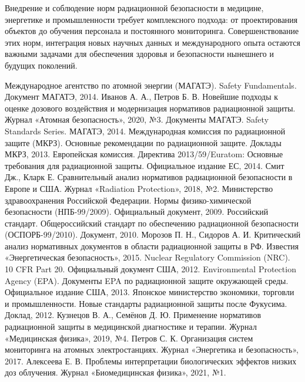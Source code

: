 \documentclass[a4paper, 14pt]{extarticle}
\begin{document}
Внедрение и соблюдение норм радиационной безопасности в медицине, энергетике и промышленности требует комплексного подхода: от проектирования объектов до обучения персонала и постоянного мониторинга. Совершенствование этих норм, интеграция новых научных данных и международного опыта остаются важными задачами для обеспечения здоровья и безопасности нынешнего и будущих поколений.


\newpage
\begin{thebibliography}{99}
     Международное агентство по атомной энергии (МАГАТЭ). Safety Fundamentals. Документ МАГАТЭ, 2014.
     Иванов А. А., Петров Б. В. Новейшие подходы к оценке дозового воздействия и модернизация нормативов радиационной защиты. Журнал «Атомная безопасность», 2020, №3.
     Документы МАГАТЭ. Safety Standards Series. МАГАТЭ, 2014.
     Международная комиссия по радиационной защите (МКРЗ). Основные рекомендации по радиационной защите. Доклады МКРЗ, 2013.
     Европейская комиссия. Директива 2013/59/Euratom: Основные требования для радиационной защиты. Официальное издание ЕС, 2014.
     Смит Дж., Кларк Е. Сравнительный анализ нормативов радиационной безопасности в Европе и США. Журнал «Radiation Protection», 2018, №2.
     Министерство здравоохранения Российской Федерации. Нормы физико-химической безопасности (НПБ-99/2009). Официальный документ, 2009.
     Российский стандарт. Общероссийский стандарт по обеспечению радиационной безопасности (ОСПОРБ-99/2010). Документ, 2010.
     Морозов П. Н., Сидоров А. И. Критический анализ нормативных документов в области радиационной защиты в РФ. Известия «Энергетическая безопасность», 2015.
     Nuclear Regulatory Commission (NRC). 10 CFR Part 20. Официальный документ США, 2012.
     Environmental Protection Agency (EPA). Документы EPA по радиационной защите окружающей среды. Официальное издание США, 2013.
     Японское министерство экономики, торговли и промышленности. Новые стандарты радиационной защиты после Фукусима. Доклад, 2012.
     Кузнецов В. А., Семёнов Д. Ю. Применение нормативов радиационной защиты в медицинской диагностике и терапии. Журнал «Медицинская физика», 2019, №4.
     Петров С. К. Организация систем мониторинга на атомных электростанциях. Журнал «Энергетика и безопасность», 2017.
     Алексеева Е. В. Проблемы интерпретации биологических эффектов низких доз облучения. Журнал «Биомедицинская физика», 2021, №1.
\end{thebibliography}
\end{document}

